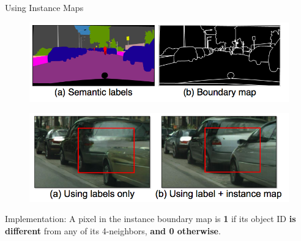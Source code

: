 \documentclass{beamer}
\begin{document}
\begin{frame}{Using Instance Maps}
	\begin{figure}
		\centering
		\includegraphics[height=0.3\textheight]{images/instance_maps}
	\end{figure}
	\begin{figure}
		\centering
		\includegraphics[height=0.3\textheight]{images/instance_result}
	\end{figure}

%
%
\begin{beamerboxesrounded}[upper=uppercol,lower=lowercol,shadow=false]{Implementation:}
A pixel in the instance boundary map is \textbf{1} if its object ID \textbf{is different} from any of its 4-neighbors, \textbf{and 0 otherwise}.
\end{beamerboxesrounded}
\end{frame}
\end{document}
